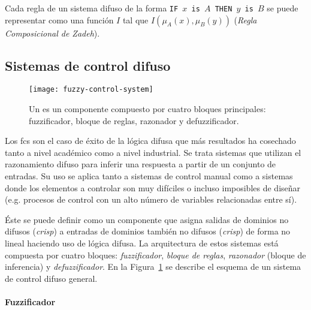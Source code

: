 Cada regla de un sistema difuso de la forma \texttt{IF $x$ is $A$ THEN $y$ is $B$} se puede representar como una función $I$ tal que $I(\mu_A(x), \mu_B(y))$ (\textit{Regla Composicional de Zadeh}).

\subsection{Sistemas de control difuso}
\label{ss:fcs}

\begin{figure}[!b]
	\centering
	\texttt{[image: fuzzy-control-system]}
	\caption[Esquema de un ]{Un  es un componente compuesto por cuatro bloques principales: fuzzificador, bloque de reglas, razonador y defuzzificador.}
	\label{fig:fuzzy-control-system}
\end{figure}

Los \Acrfull{fcs} son el caso de éxito de la lógica difusa que más resultados ha cosechado tanto a nivel académico como a nivel industrial. Se trata sistemas que utilizan el razonamiento difuso para inferir una respuesta a partir de un conjunto de entradas. Su uso se aplica tanto a sistemas de control manual como a sistemas donde los elementos a controlar son muy difíciles o incluso imposibles de diseñar (e.g. procesos de control con un alto número de variables relacionadas entre sí).

Éste se puede definir como un componente que asigna salidas de dominios no difusos (\textit{crisp}) a entradas de dominios también no difusos (\textit{crisp}) de forma no lineal haciendo uso de lógica difusa. La arquitectura de estos sistemas está compuesta por cuatro bloques: \textit{fuzzificador}, \textit{bloque de reglas}, \textit{razonador} (bloque de inferencia) y \textit{defuzzificador}. En la Figura~\ref{fig:fuzzy-control-system} se describe el esquema de un sistema de control difuso general.

\paragraph{Fuzzificador}

